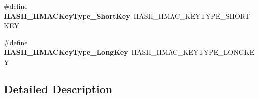 \begin{DoxyCompactItemize}
\item 
\hypertarget{group___h_a_l___h_a_s_h___aliased___functions_ga75d858a8b5b891edc321486eebe74692}{\#define {\bfseries H\-A\-S\-H\-\_\-\-H\-M\-A\-C\-Key\-Type\-\_\-\-Short\-Key}~H\-A\-S\-H\-\_\-\-H\-M\-A\-C\-\_\-\-K\-E\-Y\-T\-Y\-P\-E\-\_\-\-S\-H\-O\-R\-T\-K\-E\-Y}\label{group___h_a_l___h_a_s_h___aliased___functions_ga75d858a8b5b891edc321486eebe74692}

\item 
\hypertarget{group___h_a_l___h_a_s_h___aliased___functions_ga99296878d9ed1d3ede590fdeef8f8394}{\#define {\bfseries H\-A\-S\-H\-\_\-\-H\-M\-A\-C\-Key\-Type\-\_\-\-Long\-Key}~H\-A\-S\-H\-\_\-\-H\-M\-A\-C\-\_\-\-K\-E\-Y\-T\-Y\-P\-E\-\_\-\-L\-O\-N\-G\-K\-E\-Y}\label{group___h_a_l___h_a_s_h___aliased___functions_ga99296878d9ed1d3ede590fdeef8f8394}

\end{DoxyCompactItemize}


\subsection{Detailed Description}
